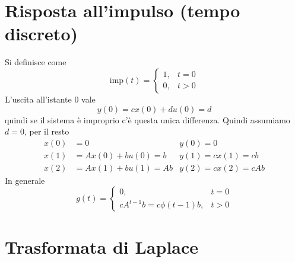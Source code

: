 \documentclass[10pt,a4paper]{book}
\begin{document}
\section{Risposta all'impulso (tempo discreto)}

Si definisce come
\begin{equation*}
\mathrm{imp}( t) =\begin{cases}
1, & t=0\\
0, & t >0
\end{cases}
\end{equation*}
L'uscita all'istante $0$ vale
\begin{equation*}
y( 0) =cx( 0) +du( 0) =d
\end{equation*}
quindi se il sistema è improprio c'è questa unica differenza. Quindi assumiamo $d=0$, per il resto
\begin{equation*}
\begin{aligned}
x( 0) & =0 & y( 0) =0\\
x( 1) & =Ax( 0) +bu( 0) =b & y( 1) =cx( 1) =cb\\
x( 2) & =Ax( 1) +bu( 1) =Ab & y( 2) =cx( 2) =cAb
\end{aligned}
\end{equation*}
In generale
\begin{equation*}
\boxed{g( t) =\begin{cases}
0, & t=0\\
cA^{t-1} b=c\phi ( t-1) b, & t >0
\end{cases}}
\end{equation*}
\section{Trasformata di Laplace}
\end{document}
